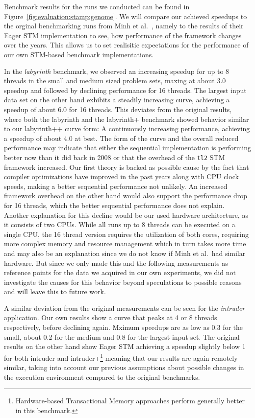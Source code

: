 Benchmark results for the runs we conducted can be found in Figure~\ref{fig:evaluation:stamp:genome}.
We will compare our achieved speedups to the orginal benchmarking runs from Minh et al.~\cite{minh2008stamp}, namely to the results of their Eager STM implementation to see, how performance of the framework changes over the years.
This allows us to set realisitic expectations for the performance of our own STM-based benchmark implementations.

In the \emph{labyrinth} benchmark, we observed an increasing speedup for up to 8 threads in the small and medium sized problem sets, maxing at about 3.0 speedup and followed by declining performance for 16 threads.
The largest input data set on the other hand exhibits a steadily increasing curve, achieving a speedup of about 6.0 for 16 threads.
This deviates from the original results, where both the labyrinth and the labyrinth+ benchmark showed behavior similar to our labyrinth++ curve form: A continuously increasing performance, achieving a speedup of about 4.0 at best.
The form of the curve and the overall reduced performance may indicate that either the sequential implementation is performing better now than it did back in 2008 or that the overhead of the \texttt{tl2} STM framework increased.
Our first theory is backed as possible cause by the fact that compiler optimizations have improved in the past years along with CPU clock speeds, making a better sequential performance not unlikely.
An increased framework overhead on the other hand would also support the performance drop for 16 threads, which the better sequential performance does not explain.
Another explanation for this decline would be our used hardware architecture, as it consists of two CPUs.
While all runs up to 8 threads can be executed on a single CPU, the 16 thread version requires the utilization of both cores, requiring more complex memory and resource management which in turn takes more time and may also be an explanation since we do not know if Minh et al.\ had similar hardware.
But since we only made this and the following measurements as reference points for the data we acquired in our own experiments, we did not investigate the causes for this behavior beyond speculations to possible reasons and will leave this to future work.

A similar deviation from the original measurements can be seen for the \emph{intruder} application.
Our own results show a curve that peaks at 4 or 8 threads respectively, before declining again.
Mximum speedups are as low as 0.3 for the small, about 0.2 for the medium and 0.8 for the largest input set.
The original results on the other hand show Eager STM achieving a speedup slightly below 1 for both intruder and intruder+\footnote{Hardware-based Transactional Memory approaches perform generally better in this benchmark.} meaning that our results are again remotely similar, taking into account our previous assumptions about possible changes in the execution environment compared to the original benchmarks.

